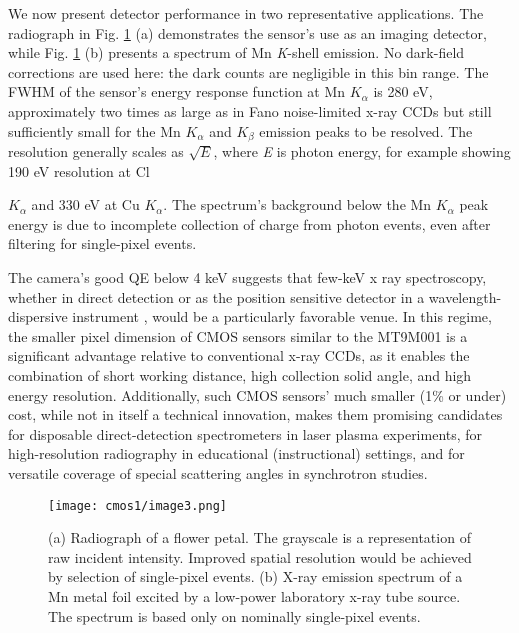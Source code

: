 We now present detector performance in two representative applications.
The radiograph in Fig. \ref{cm1image3} (a) demonstrates the sensor's use as an imaging
detector, while Fig. \ref{cm1image3} (b) presents a spectrum of Mn \emph{K}-shell
emission. No dark-field corrections are used here: the dark counts are
negligible in this bin range. The FWHM of the sensor's energy response
function at Mn \(K_{\alpha}\) is 280 eV, approximately two times as
large as in Fano noise-limited x-ray CCDs but still sufficiently small
for the Mn \(K_{\alpha}\) and \(K_{\beta}\) emission peaks to be
resolved. The resolution generally scales as \(\sqrt{E}\), where
\emph{E} is photon energy, for example showing 190 eV resolution at Cl
\(K_{\alpha}\)
and 330 eV at Cu \(K_{\alpha}\). The spectrum's background below the Mn
\(K_{\alpha}\) peak energy is due to incomplete collection of charge
from photon events, even after filtering for single-pixel events.

The camera's good QE below 4 keV suggests that few-keV x ray
spectroscopy, whether in direct detection or as the position sensitive
detector in a wavelength-dispersive
instrument \cite{huotari2005improving}, would be a
particularly favorable venue. In this regime, the smaller pixel
dimension of CMOS sensors similar to the MT9M001 is a significant
advantage relative to conventional x-ray CCDs, as it enables the
combination of short working distance, high collection solid angle, and
high energy
resolution.
 \cite{pacold2012miniature, mattern2012plastic, dickinson2008short} Additionally, such
CMOS sensors' much smaller (1\% or under) cost, while not in itself a
technical innovation, makes them promising candidates for disposable
direct-detection spectrometers in laser plasma experiments, for
high-resolution radiography in educational (instructional) settings,
and for versatile coverage of special scattering angles in synchrotron
studies.

\begin{figure}[h] \label{cm1image3}
\caption{ (a) Radiograph of a flower petal. The grayscale is a
representation of raw incident intensity. Improved spatial resolution
would be achieved by selection of single-pixel
events. (b) X-ray
emission spectrum of a Mn metal foil excited by a low-power laboratory
x-ray tube source. The spectrum is based only on nominally single-pixel
events.}
\centering
\texttt{[image: cmos1/image3.png]}
\end{figure}

